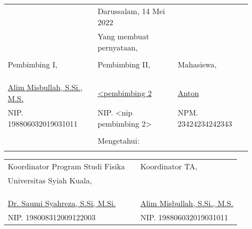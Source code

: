\vspace{0.4cm}
{\renewcommand{\arraystretch}{0.8}
\centering
\begin{tabular}{lll}
	&Darussalam, 14 Mei 2022		& \\
	&Yang membuat pernyataan,			& \\
	&&\\
	Pembimbing I,							&Pembimbing II,							&Mahasiswa,\\
	&&\\
	&&\\
	&&\\
	\underline{Alim Misbullah, S.Si., M.S.}	&\underline{<pembimbing 2} &\underline{Anton}\\
	NIP. 198806032019031011				&NIP. <nip pembimbing 2>				&NPM. 23424234242343\\
	&&\\
	&Mengetahui:\\			&
\end{tabular}
}
{\renewcommand{\arraystretch}{0.8}
\begin{tabular}{lll}
	Koordinator Program Studi Fisika	&\qquad\qquad  &Koordinator TA,\\
	Universitas Syiah Kuala,&\quad\quad  &\\
	&&\\
	&&\\
	&&\\
	\underline{Dr. Saumi Syahreza, S.Si, M.Si.}	&\quad\quad  &\underline{Alim Misbullah, S.Si., M.S.}\\
	NIP. 198008312009122003						&\quad\quad  &NIP. 198806032019031011				
\end{tabular}
}